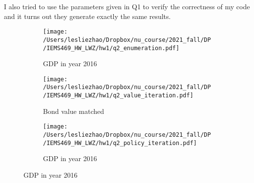 \documentclass[12pt,letterpaper]{article}
\begin{document}
I also tried to use the parameters given in Q1 to verify the correctness of my code and it turns out they generate exactly the same results.
\begin{figure}[H] 
	\centering
	\caption{Option Characteristics}
	\begin{subfigure}[h]{0.48\textwidth}
		\centering
		\texttt{[image: /Users/lesliezhao/Dropbox/nu\_course/2021\_fall/DP/IEMS469\_HW\_LWZ/hw1/q2\_enumeration.pdf]}
		\caption{GDP in year 2016}
	\end{subfigure}
	\begin{subfigure}[h]{0.48\textwidth}
		\centering
		\texttt{[image: /Users/lesliezhao/Dropbox/nu\_course/2021\_fall/DP/IEMS469\_HW\_LWZ/hw1/q2\_value\_iteration.pdf]}
		\caption{Bond value matched}
	\end{subfigure}
	\begin{subfigure}[h]{0.48\textwidth}
		\centering
		\texttt{[image: /Users/lesliezhao/Dropbox/nu\_course/2021\_fall/DP/IEMS469\_HW\_LWZ/hw1/q2\_policy\_iteration.pdf]}
		\caption{GDP in year 2016}
	\end{subfigure}
	\label{votemap}
\end{figure}
\clearpage
\setlength
\end{document}
